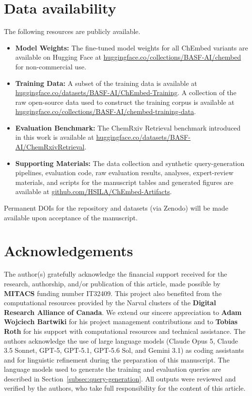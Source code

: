 \documentclass[twoside,twocolumn,9pt]{article}
\begin{document}
\section*{Data availability}
The following resources are publicly available.
\begin{itemize}
    \item \textbf{Model Weights:} The fine-tuned model weights for all ChEmbed variants are available on Hugging Face at \href{https://huggingface.co/collections/BASF-AI/chembed}{huggingface.co/collections/BASF-AI/chembed} for non-commercial use.
    \item \textbf{Training Data:} A subset of the training data is available at \href{https://huggingface.co/datasets/BASF-AI/ChEmbed-Training}{huggingface.co/datasets/BASF-AI/ChEmbed-Training}. A collection of the raw open-source data used to construct the training corpus is available at \href{https://huggingface.co/collections/BASF-AI/chembed-training-data}{huggingface.co/collections/BASF-AI/chembed-training-data}.
    \item \textbf{Evaluation Benchmark:} The ChemRxiv Retrieval benchmark introduced in this work is available at \href{https://huggingface.co/datasets/BASF-AI/ChemRxivRetrieval}{huggingface.co/datasets/BASF-AI/ChemRxivRetrieval}.
    \item \textbf{Supporting Materials:} The data collection and synthetic query-generation pipelines, evaluation code, raw evaluation results, analyses, expert-review materials, and scripts for the manuscript tables and generated figures are available at \href{https://github.com/HSILA/ChEmbed-Artifacts}{github.com/HSILA/ChEmbed-Artifacts}.
\end{itemize}

Permanent DOIs for the repository and datasets (via Zenodo) will be made available upon acceptance of the manuscript.

\section*{Acknowledgements}
The author(s) gratefully acknowledge the financial support received for the research, authorship, and/or publication of this article, made possible by \textbf{MITACS} funding number IT32409. This project also benefited from the computational resources provided by the Narval clusters of the \textbf{Digital Research Alliance of Canada}. We extend our sincere appreciation to \textbf{Adam Wojciech Bartwiki} for his project management contributions and to \textbf{Tobias Roth} for his support with computational resources and technical assistance. The authors acknowledge the use of large language models (Claude Opus 5, Claude 3.5 Sonnet, GPT-5, GPT-5.1, GPT-5.6 Sol, and Gemini 3.1) as coding assistants and for linguistic refinement during the preparation of this manuscript. The language models used to generate the training and evaluation queries are described in Section~\ref{subsec:query-generation}. All outputs were reviewed and verified by the authors, who take full responsibility for the content of this article.
\end{document}
